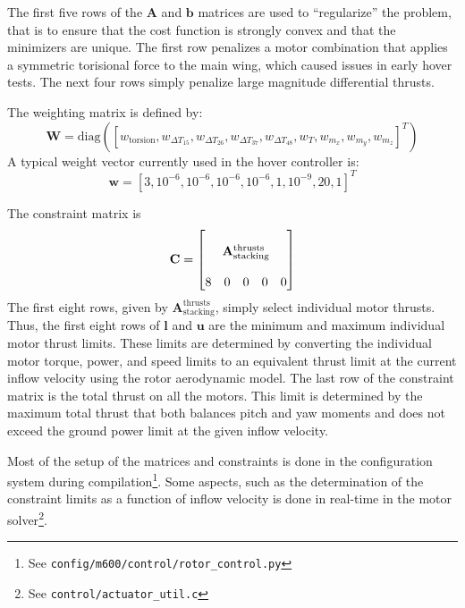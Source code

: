 \documentclass[11pt]{amsart}
\newcommand{\Astackingthrusts}{\mathbf{A}_{\mathrm{stacking}}^{\mathrm{thrusts}}}
\newcommand{\diag}{\mathrm{diag}}
\begin{document}
The first five rows of the $\mathbf{A}$ and $\mathbf{b}$ matrices are
used to ``regularize'' the problem, that is to ensure that the cost
function is strongly convex and that the minimizers are unique.  The
first row penalizes a motor combination that applies a symmetric
torisional force to the main wing, which caused issues in early hover
tests.  The next four rows simply penalize large magnitude
differential thrusts.

The weighting matrix is defined by:
%
\begin{equation}
  \mathbf{W} = \diag(
  [w_{\mathrm{torsion}},
   w_{\Delta T_{15}}, w_{\Delta T_{26}}, w_{\Delta T_{37}}, w_{\Delta T_{48}},
   w_T, w_{m_x}, w_{m_y}, w_{m_z}]^T)
\end{equation}
%
A typical weight vector currently used in the hover controller is:
%
\begin{equation}
  \mathbf{w} = [3, 10^{-6}, 10^{-6}, 10^{-6}, 10^{-6}, 1, 10^{-9}, 20, 1]^T
\end{equation}

The constraint matrix is
%
\begin{equation}
  \mathbf{C} =
  \begin{bmatrix}
      &   &   &   & \\
    \multicolumn{5}{c}{\Astackingthrusts} \\
      &   &   &   & \\
    8 & 0 & 0 & 0 & 0
  \end{bmatrix}
\end{equation}
%
The first eight rows, given by $\Astackingthrusts$, simply select
individual motor thrusts.  Thus, the first eight rows of $\mathbf{l}$
and $\mathbf{u}$ are the minimum and maximum individual motor thrust
limits.  These limits are determined by converting the individual
motor torque, power, and speed limits to an equivalent thrust limit at
the current inflow velocity using the rotor aerodynamic model.  The
last row of the constraint matrix is the total thrust on all the
motors.  This limit is determined by the maximum total thrust that
both balances pitch and yaw moments and does not exceed the ground
power limit at the given inflow velocity.

Most of the setup of the matrices and constraints is done in the
configuration system during compilation\footnote{ See
  {\texttt{config/m600/control/rotor\_control.py}}}.  Some
aspects, such as the determination of the constraint limits as a
function of inflow velocity is done in real-time in the motor
solver\footnote{ See
  {\texttt{control/actuator\_util.c}}}.
\end{document}
